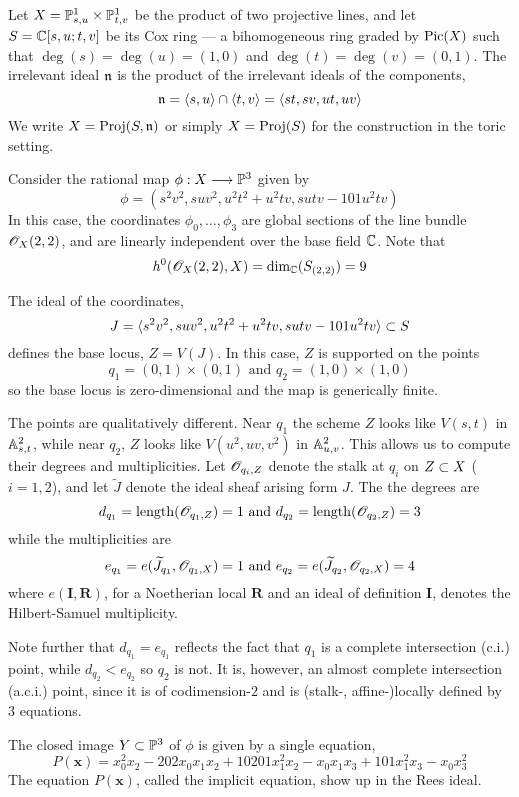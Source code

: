 \documentclass[fleqn,reqno]{amsart}
\begin{document}
\begin{example}[$\mt{ex201}$]
\label{ex201}
Let $X=\PP^1_{s,u}\times\PP^1_{t,v}$ be the product of two projective lines,
and let $S=\CC[s,u;t,v]$ be its Cox ring --- a bihomogeneous ring graded by $\Pic(X)$
such that $\deg(s)=\deg(u)=(1,0)$ and $\deg(t)=\deg(v)=(0,1)$.
The irrelevant ideal $\n$ is the product of the irrelevant ideals of the components,
\[
	\n=\la s,u\ra\cap\la t,v\ra=\la st,sv,ut,uv\ra
\]
We write $X=\Proj(S,\n)$ or simply $X=\Proj(S)$ for the construction in the toric setting.

Consider the rational map $\phi:X\To\PP^3$ given by
\[
	\phi=(s^{2} v^{2},s u v^{2},u^{2} t^{2}+u^{2} t v,s u t v-101 u^{2}t v)
\]
In this case, the coordinates $\phi_0,\ldots,\phi_3$ are global sections
of the line bundle $\O_X(2,2)$, and are linearly independent over the base field $\CC$.
Note that
\[
	h^0(\O_X(2,2),X)=\dim_\CC(S_{(2,2)})=9
\]

The ideal of the coordinates,
\[
	J=\la s^{2} v^{2},s u v^{2},u^{2} t^{2}+u^{2} t v,s u t v-101 u^{2}t v\ra\se S
\]
defines the base locus, $Z=V(J)$.
In this case, $Z$ is supported on the points
\[
	q_1=(0,1)\times(0,1) \text{ and } q_2=(1,0)\times(1,0)
\]
so the base locus is zero-dimensional and the map is generically finite.

The points are qualitatively different.
Near $q_1$ the scheme $Z$ looks like $V(s,t)$ in $\AA^2_{s,t}$,
while near $q_2$, $Z$ looks like $V(u^2,uv,v^2)$ in $\AA^2_{u,v}$.
This allows us to compute their degrees and multiplicities.
Let $\O_{q_i,Z}$ denote the stalk at $q_i$ on $Z\se X$ ($i=1,2$),
and let $\widetilde J$ denote the ideal sheaf arising form $J$.
The the degrees are
\[
	d_{q_1}=\length(\O_{q_1,Z})=1 \text{ and } d_{q_2}=\length(\O_{q_2,Z})=3
\]
while the multiplicities are
\[
	e_{q_1}=e(\widetilde{J}_{q_1},\O_{q_1,X})=1 \text{ and } e_{q_2}=e(\widetilde{J}_{q_2},\O_{q_2,X})=4
\]
where $e(\mathbf I,\mathbf R)$,
for a Noetherian local $\mathbf R$ and an ideal of definition $\mathbf I$,
denotes the Hilbert-Samuel multiplicity.

Note further that $d_{q_1}=e_{q_1}$ reflects the fact that $q_1$ is a complete intersection
(c.i.) point,
while $d_{q_2}<e_{q_2}$ so $q_2$ is not.
It is, however, an almost complete intersection (a.c.i.) point,
since it is of codimension-$2$ and is (stalk-, affine-)locally defined by $3$ equations.

The closed image $Y\se\PP^3$ of $\phi$ is given by a single equation,
\[
	P(\mathbf x)={x}_{0}^{2} {x}_{2}-202 {x}_{0} {x}_{1} {x}_{2}+10201
  {x}_{1}^{2} {x}_{2}-{x}_{0} {x}_{1} {x}_{3}+101 {x}_{1}^{2} {x}_{3}-{x}_{0}
  {x}_{3}^{2}
\]
The equation $P(\mathbf x)$, called the implicit equation, show up in the Rees ideal.


\end{example}
\end{document}
